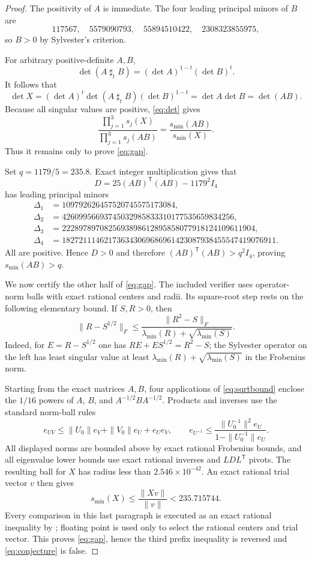 \documentclass[11pt]{article}
\newcommand{\smin}{s_{\min}}
\newcommand{\sharpw}{\mathbin{\sharp}}
\begin{document}
\begin{proof}
The positivity of $A$ is immediate.  The four leading principal minors of $B$
are
\[
117567,\quad 5579090793,\quad 55894510422,\quad 2308323855975,
\]
so $B>0$ by Sylvester's criterion.

For arbitrary positive-definite $A,B$,
\[
 \det(A\sharpw_tB)=(\det A)^{1-t}(\det B)^t.
\]
It follows that
\begin{equation}\label{eq:det}
 \det X=(\det A)^t\det(A\sharpw_tB)(\det B)^{1-t}
 =\det A\det B=\det(AB).
\end{equation}
Because all singular values are positive, \eqref{eq:det} gives
\[
 \frac{\prod_{j=1}^3s_j(X)}{\prod_{j=1}^3s_j(AB)}
 =\frac{\smin(AB)}{\smin(X)}.
\]
Thus it remains only to prove \eqref{eq:gap}.

Set $q=1179/5=235.8$.  Exact integer multiplication gives that
\[
 D=25(AB)^{\mathsf T}(AB)-1179^2I_4
\]
has leading principal minors
\begin{align*}
\Delta_1&=109792626457520745575173084,\\
\Delta_2&=42609956693745032985833310177535659834256,\\
\Delta_3&=2228978970825693898612895858077918124109611904,\\
\Delta_4&=182721114621736343069686961423087938455547419076911.
\end{align*}
All are positive.  Hence $D>0$ and therefore
$(AB)^{\mathsf T}(AB)>q^2I_4$, proving $\smin(AB)>q$.

We now certify the other half of \eqref{eq:gap}.  The included verifier uses
operator-norm balls with exact rational centers and radii.  Its square-root
step rests on the following elementary bound.  If $S,R>0$, then
\begin{equation}\label{eq:sqrtbound}
 \|R-S^{1/2}\|_F
 \le
 \frac{\|R^2-S\|_F}{\lambda_{\min}(R)+\sqrt{\lambda_{\min}(S)}}.
\end{equation}
Indeed, for $E=R-S^{1/2}$ one has
$RE+ES^{1/2}=R^2-S$; the Sylvester operator on the left has least singular
value at least
$\lambda_{\min}(R)+\sqrt{\lambda_{\min}(S)}$ in the Frobenius norm.

Starting from the exact matrices $A,B$, four applications of
\eqref{eq:sqrtbound} enclose the $1/16$ powers of $A$, $B$, and
$A^{-1/2}BA^{-1/2}$.  Products and inverses use the standard norm-ball rules
\[
 e_{UV}\le\|U_0\|e_V+\|V_0\|e_U+e_Ue_V,
 \qquad
 e_{U^{-1}}\le
 \frac{\|U_0^{-1}\|^2e_U}{1-\|U_0^{-1}\|e_U}.
\]
All displayed norms are bounded above by exact rational Frobenius bounds, and
all eigenvalue lower bounds use exact rational inverses and $LDL^{\mathsf T}$
pivots.  The resulting ball for $X$ has radius less than
$2.546\times10^{-42}$.  An exact rational trial vector $v$ then gives
\[
 \smin(X)\le \frac{\|Xv\|}{\|v\|}<235.715744.
\]
Every comparison in this last paragraph is executed as an exact rational
inequality by ; floating point is used
only to select the rational centers and trial vector.  This proves
\eqref{eq:gap}, hence the third prefix inequality is reversed and
\eqref{eq:conjecture} is false.
\end{proof}
\end{document}
